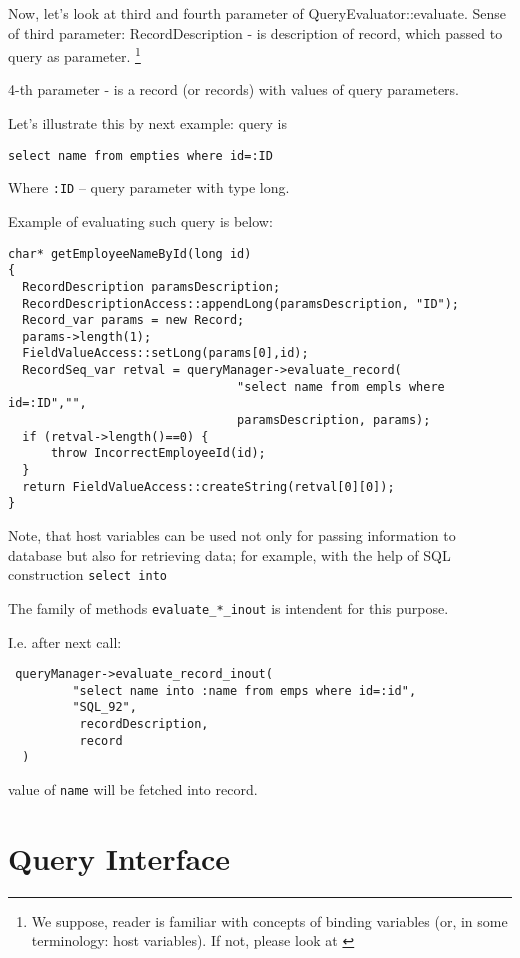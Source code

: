 \documentclass[10pt]{article}
\begin{document}
 Now, let's look at third and fourth parameter of QueryEvaluator::evaluate.
 Sense of third parameter: RecordDescription - is description of record,
 which passed to query as parameter.
 \footnote{
 We suppose, reader is familiar with concepts of binding variables (or,
  in some terminology: host variables). If not, please look at
 \cite{ORACLE-1}
}

 4-th parameter - is a record (or records) with values of query
 parameters.

 Let's illustrate this by next example:
 query is
\begin{verbatim}
select name from empties where id=:ID
\end{verbatim}

 Where \verb|:ID| -- query parameter with type long.

 Example of evaluating such query is below:

\begin{verbatim}
char* getEmployeeNameById(long id)
{
  RecordDescription paramsDescription;
  RecordDescriptionAccess::appendLong(paramsDescription, "ID");
  Record_var params = new Record;
  params->length(1);
  FieldValueAccess::setLong(params[0],id);
  RecordSeq_var retval = queryManager->evaluate_record(
                                "select name from empls where id=:ID","",
                                paramsDescription, params);
  if (retval->length()==0) {
      throw IncorrectEmployeeId(id);
  }
  return FieldValueAccess::createString(retval[0][0]);
}

\end{verbatim}

 Note, that host variables can be used not only  for passing information
to database but also for retrieving data; for example, with the help of 
SQL construction \verb|select into|

 The family of methods \verb|evaluate_*_inout| is intendent for this purpose.

 I.e. after next call: 
\begin{verbatim}
 queryManager->evaluate_record_inout(
         "select name into :name from emps where id=:id",
         "SQL_92",
          recordDescription,
          record
  ) 
\end{verbatim}

 value of \verb|name| will be fetched into record.

\section{ Query Interface }
\end{document}
